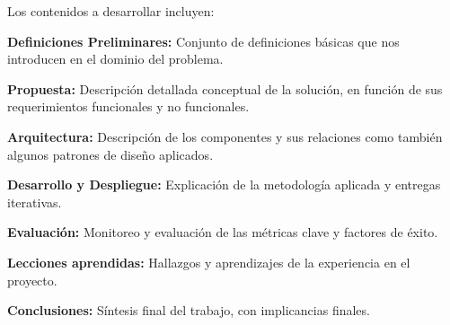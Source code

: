 Los contenidos a desarrollar incluyen:

\textbf{Definiciones Preliminares:} Conjunto de definiciones básicas que nos introducen en el dominio del problema.

\textbf{Propuesta:} Descripción detallada conceptual de la solución, en función de sus requerimientos funcionales y no funcionales. \cite{zave1979} \cite{yeh1980}

\textbf{Arquitectura:} Descripción de los componentes y sus relaciones como también algunos patrones de diseño aplicados. \cite{yourdon1979} \cite{erl2005} \cite{fowler2003}

\textbf{Desarrollo y Despliegue:} Explicación de la metodología aplicada y entregas iterativas. 

\textbf{Evaluación:} Monitoreo y evaluación de las métricas clave y factores de éxito.

\textbf{Lecciones aprendidas:} Hallazgos y aprendizajes de la experiencia en el proyecto.

\textbf{Conclusiones:} Síntesis final del trabajo, con implicancias finales.

